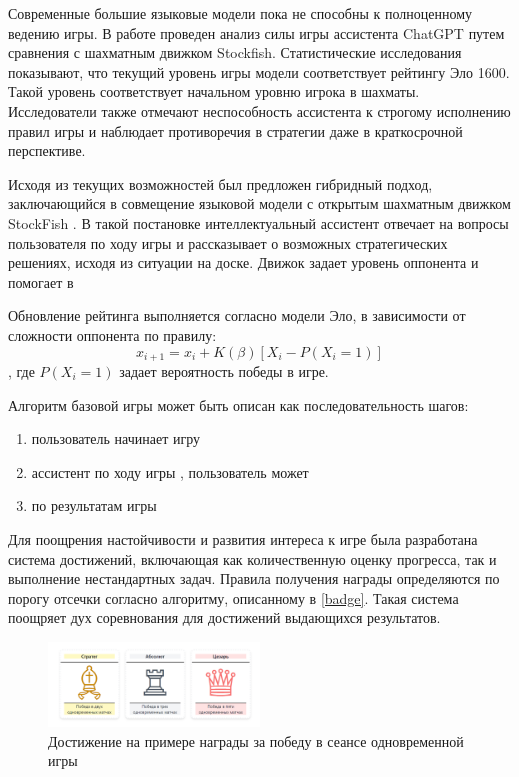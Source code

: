 Современные большие языковые модели пока не способны к полноценному ведению игры. В работе \cite{Adam2024} проведен анализ силы игры ассистента ChatGPT
путем сравнения с шахматным движком Stockfish. Статистические исследования показывают, что текущий уровень игры
модели соответствует рейтингу Эло 1600\cite{elo1967proposed}. Такой уровень соответствует начальном уровню игрока в шахматы. Исследователи также отмечают неспособность ассистента к строгому исполнению правил игры
и наблюдает противоречия в стратегии даже в краткосрочной перспективе.

Исходя из текущих возможностей был предложен гибридный подход, заключающийся в совмещение языковой модели с 
открытым шахматным движком StockFish \cite{acher2016large}. 
В такой постановке интеллектуальный ассистент отвечает на вопросы пользователя по ходу игры и
рассказывает о возможных стратегических решениях, исходя из ситуации на доске. 
Движок задает уровень оппонента и помогает в 

Обновление рейтинга выполняется согласно модели Эло, в зависимости от сложности оппонента по правилу:
\begin{equation}
    x_{i+1}=x_i + K(\beta) \left[X_i-P(X_i=1)\right]
\end{equation}
, где $P(X_i=1)$ задает вероятность победы в игре.

Алгоритм базовой игры может быть описан как последовательность шагов:
\begin{enumerate}
    \item пользователь начинает игру 
    \item ассистент по ходу игры , пользователь может  
    \item по результатам игры
\end{enumerate}

Для поощрения настойчивости и развития интереса к игре была разработана
система достижений, включающая как количественную оценку прогресса, так и выполнение нестандартных задач.
Правила получения награды определяются по порогу отсечки согласно алгоритму, описанному в \ref{badge}.
Такая система поощряет дух соревнования для достижений выдающихся результатов.

\begin{figure}[h]
    \centering
    \includegraphics[width=0.5\textwidth]{assets/work/games/achieve.png}
    \caption{Достижение на примере награды за победу в сеансе одновременной игры}
    \label{achievement}
\end{figure}

